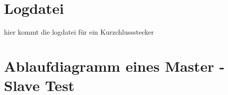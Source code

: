 \newpage
\section{Logdatei}\label{LogDatei}
hier kommt die logdatei für ein Kurzchlussstecker

\newpage
\section{Ablaufdiagramm eines Master - Slave Test}\label{MasterSlaveDiagramm}

